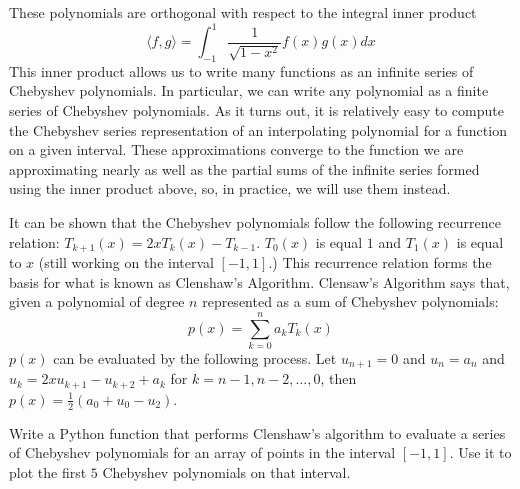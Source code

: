 These polynomials are orthogonal with respect to the integral inner product
\[\langle f, g \rangle = \int_{-1}^1 \frac{1}{\sqrt{1 - x^2}} f\left( x \right) g\left( x \right) dx\]
This inner product allows us to write many functions as an infinite series of Chebyshev polynomials.
In particular, we can write any polynomial as a finite series of Chebyshev polynomials.
As it turns out, it is relatively easy to compute the Chebyshev series representation of an interpolating polynomial for a function on a given interval.
These approximations converge to the function we are approximating nearly as well as the partial sums of the infinite series formed using the inner product above, so, in practice, we will use them instead.

It can be shown that the Chebyshev polynomials follow the following recurrence relation: $ T_{k+1} \left( x \right) = 2 x T_k \left( x \right) - T_{k-1}$.
$T_0 \left( x \right)$ is equal $1$ and $T_1 \left( x \right)$ is equal to $x$ (still working on the interval $[-1, 1]$.)
This recurrence relation forms the basis for what is known as Clenshaw's Algorithm.
Clensaw's Algorithm says that, given a polynomial of degree $n$ represented as a sum of Chebyshev polynomials:
\[p\left(x\right) = \sum_{k=0}^{n} a_k T_k\left(x\right)\]
$p(x)$ can be evaluated by the following process.
Let $u_{n+1} = 0$ and $u_{n} = a_n$ and $u_k = 2 x u_{k+1} - u_{k+2} + a_k$ for $k = n-1, n-2, \dots, 0$, then $p(x) = \frac{1}{2} \left( a_0 + u_0 - u_2 \right)$.

\begin{problem}
Write a Python function that performs Clenshaw's algorithm to evaluate a series of Chebyshev polynomials for an array of points in the interval $[-1, 1]$.
Use it to plot the first $5$ Chebyshev polynomials on that interval.
\end{problem}

